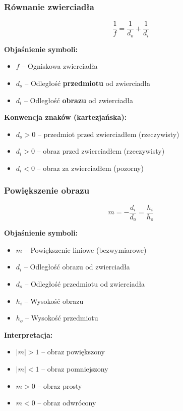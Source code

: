 \documentclass[12pt,a4paper]{article}
\newcommand{\oznaczenie}[2]{%
  \item $#1$ -- #2%
}
\begin{document}
\subsubsection{Równanie zwierciadła}

\begin{wzorbox}
\begin{equation}
  \frac{1}{f} = \frac{1}{d_o} + \frac{1}{d_i}
  \label{eq:zwierciadlo}
\end{equation}
\end{wzorbox}

\begin{objasnbox}
\textbf{Objaśnienie symboli:}
\begin{itemize}[leftmargin=2em]
  \oznaczenie{f}{Ogniskowa zwierciadła \quad [\textbf{m}]}
  \oznaczenie{d_o}{Odległość \textbf{przedmiotu} od zwierciadła \quad [\textbf{m}]}
  \oznaczenie{d_i}{Odległość \textbf{obrazu} od zwierciadła \quad [\textbf{m}]}
\end{itemize}
\textbf{Konwencja znaków (kartezjańska):}
\begin{itemize}
  \item $d_o > 0$ -- przedmiot przed zwierciadłem (rzeczywisty)
  \item $d_i > 0$ -- obraz przed zwierciadłem (rzeczywisty)
  \item $d_i < 0$ -- obraz za zwierciadłem (pozorny)
\end{itemize}
\end{objasnbox}

\subsubsection{Powiększenie obrazu}

\begin{wzorbox}
\begin{equation}
  m = -\frac{d_i}{d_o} = \frac{h_i}{h_o}
  \label{eq:powiekszenie_zwierciadlo}
\end{equation}
\end{wzorbox}

\begin{objasnbox}
\textbf{Objaśnienie symboli:}
\begin{itemize}[leftmargin=2em]
  \oznaczenie{m}{Powiększenie liniowe (bezwymiarowe)}
  \oznaczenie{d_i}{Odległość obrazu od zwierciadła \quad [\textbf{m}]}
  \oznaczenie{d_o}{Odległość przedmiotu od zwierciadła \quad [\textbf{m}]}
  \oznaczenie{h_i}{Wysokość obrazu \quad [\textbf{m}]}
  \oznaczenie{h_o}{Wysokość przedmiotu \quad [\textbf{m}]}
\end{itemize}
\textbf{Interpretacja:}
\begin{itemize}
  \item $|m|>1$ -- obraz powiększony
  \item $|m|<1$ -- obraz pomniejszony
  \item $m>0$   -- obraz prosty
  \item $m<0$   -- obraz odwrócony
\end{itemize}
\end{objasnbox}
\end{document}
